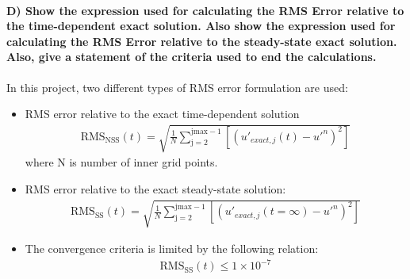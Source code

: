 \documentclass[letterpaper,10pt,english]{sphinxmanual}
\begin{document}
\paragraph{D) Show the expression used for calculating the RMS Error relative to the time-dependent exact solution. Also show the expression used for calculating the RMS Error relative to the steady-state exact solution. Also, give a statement of the criteria used to end the calculations.}
\label{\detokenize{cases/results:d-show-the-expression-used-for-calculating-the-rms-error-relative-to-the-time-dependent-exact-solution-also-show-the-expression-used-for-calculating-the-rms-error-relative-to-the-steady-state-exact-solution-also-give-a-statement-of-the-criteria-used-to-end-the-calculations}}
In this project, two different types of RMS error formulation are used:
\begin{itemize}
\item {} 
RMS error relative to the exact time-dependent solution
\begin{equation*}
\begin{split}\text{RMS}_{\text{NSS}}(t) = \sqrt{\frac{1}{N} \sum_{\text{j}=2}^{\text{jmax}-1} \left [ \left ( u'_{exact,j}(t) - u'^{n} \right )^{2}  \right ]}\end{split}
\end{equation*}
where N is number of inner grid points.

\item {} 
RMS error relative to the exact steady-state solution:
\begin{equation*}
\begin{split}\text{RMS}_{\text{SS}}(t) = \sqrt{\frac{1}{N} \sum_{\text{j}=2}^{\text{jmax}-1} \left [ \left ( u'_{exact,j}(t=\infty ) - u'^{n} \right )^{2}  \right ]}\end{split}
\end{equation*}
\item {} 
The convergence criteria is limited by the following relation:
\begin{equation*}
\begin{split}\text{RMS}_{\text{SS}}(t) \leqslant 1\times 10^{-7}\end{split}
\end{equation*}
\end{itemize}
\end{document}
